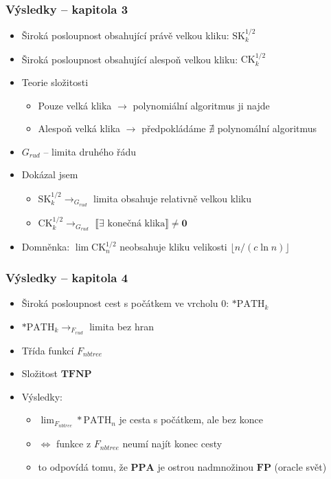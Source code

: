 \documentclass{beamer}
\newcommand{\bbl}{\llbracket}
\newcommand{\bbr}{\rrbracket}
\newcommand{\0}{\textbf{0}}
\newcommand{\1}{\textbf{1}}
\newcommand{\SK}{\text{SK}}
\newcommand{\CK}{\text{CK}}
\newcommand{\FP}{\textbf{FP}}
\newcommand{\pPATH}{*\text{PATH}}
\newcommand{\TFNP}{\textbf{TFNP}}
\newcommand{\PPA}{\textbf{PPA}}
\begin{document}
\begin{frame}
\frametitle{Výsledky -- kapitola 3}
\begin{itemize}
\item Široká posloupnost obsahující právě velkou kliku: $\SK_k^{1/2}$
\item Široká posloupnost obsahující alespoň velkou kliku: $\CK_k^{1/2}$\pause
\item Teorie složitosti
\begin{itemize}
\item Pouze velká klika $\to$ polynomiální algoritmus ji najde
\item Alespoň velká klika $\to$ předpokládáme $\nexists$ polynomální algoritmus
\end{itemize}\pause
\item $G_{rud}$ -- limita druhého řádu\pause
\item Dokázal jsem
\begin{itemize}
\item $\SK_k^{1/2}\to_{G_{rud}}$ limita obsahuje relativně velkou kliku
\item $\CK_k^{1/2}\to_{G_{rud}}$ $\bbl\text{$\exists$ konečná klika}\bbr\not=\0$
\end{itemize}\pause
\item Domněnka: $\lim\CK_n^{1/2}$ neobsahuje kliku velikosti $\lfloor n/(c \ln n)\rfloor$
\end{itemize}
\end{frame}

\begin{frame}
\frametitle{Výsledky -- kapitola 4}
\begin{itemize}
\item Široká posloupnost cest s počátkem ve vrcholu $0$: $\pPATH_k$
\item $\pPATH_k \to_{F_{rud}}$ limita bez hran\pause
\item Třída funkcí $F_{nbtree}$\pause
\item Složitost $\TFNP$\pause
\item Výsledky:
\begin{itemize}
\item $\lim_{F_{nbtree}}\pPATH_n$ je cesta s počátkem, ale bez konce
\item $\Leftrightarrow$ funkce z $F_{nbtree}$ neumí najít konec cesty 
\item to odpovídá tomu, že $\PPA$ je ostrou nadmnožinou $\FP$ (oracle svět)
\end{itemize}
\end{itemize}
\end{frame}
\end{document}
